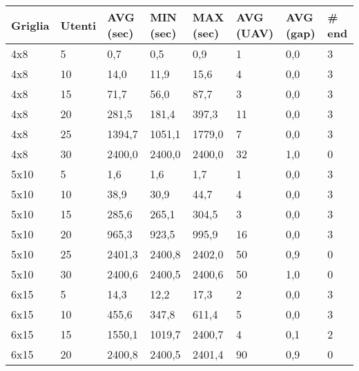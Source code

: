 \begin{table}[]
	\centering
	\scriptsize
	\begin{tabular}{@{}llllllll@{}}
		\toprule
		Griglia & Utenti & AVG (sec) & MIN (sec) & MAX (sec) & AVG (UAV)  & AVG (gap) & \# end \\ \midrule
		4x8     & 5             & 0,7           & 0,5         & 0,9         & 1          & 0,0     & 3          \\
		4x8     & 10            & 14,0          & 11,9        & 15,6        & 4          & 0,0     & 3          \\
		4x8     & 15            & 71,7          & 56,0        & 87,7        & 3          & 0,0     & 3          \\
		4x8     & 20            & 281,5         & 181,4       & 397,3       & 11         & 0,0     & 3          \\
		4x8     & 25            & 1394,7        & 1051,1      & 1779,0      & 7          & 0,0     & 3          \\
		4x8     & 30            & 2400,0        & 2400,0      & 2400,0      & 32         & 1,0     & 0          \\
		5x10    & 5             & 1,6           & 1,6         & 1,7         & 1          & 0,0     & 3          \\
		5x10    & 10            & 38,9          & 30,9        & 44,7        & 4          & 0,0     & 3          \\
		5x10    & 15            & 285,6         & 265,1       & 304,5       & 3          & 0,0     & 3          \\
		5x10    & 20            & 965,3         & 923,5       & 995,9       & 16         & 0,0     & 3          \\
		5x10    & 25            & 2401,3        & 2400,8      & 2402,0      & 50         & 0,9     & 0          \\
		5x10    & 30            & 2400,6        & 2400,5      & 2400,6      & 50         & 1,0     & 0          \\
		6x15    & 5             & 14,3          & 12,2        & 17,3        & 2          & 0,0     & 3          \\
		6x15    & 10            & 455,6         & 347,8       & 611,4       & 5          & 0,0     & 3          \\
		6x15    & 15            & 1550,1        & 1019,7      & 2400,7      & 4          & 0,1     & 2          \\
		6x15    & 20            & 2400,8        & 2400,5      & 2401,4      & 90         & 0,9     & 0          \\

\end{tabular}
\end{table}
